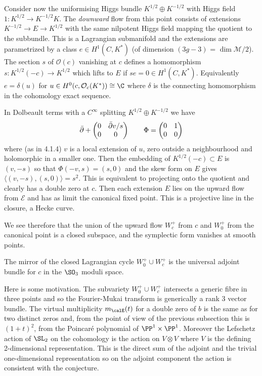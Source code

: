 Consider now the uniformising Higgs bundle $K^{1/2}\oplus K^{-1/2}$ with Higgs field $1: K^{1/2}\rightarrow K^{-1/2}K$. The {\it downward}
flow from this point consists of extensions $K^{-1/2}\rightarrow E\rightarrow K^{1/2}$ with the same nilpotent Higgs field mapping the quotient to the subbundle. This is a Lagrangian submanifold and the
extensions are parametrized by a class $e\in H^1(C,K^*)$ (of  dimension $(3g-3)$ = $\dim {\mathcal M}/2$). The section $s$
of ${\mathcal O}(c)$
vanishing at $c$ defines a homomorphism $s:K^{1/2}(-c)\rightarrow K^{1/2}$ which lifts to $E$ if $se=0\in  H^1(C,K^*)$. Equivalently
$e=\delta(u)$ for
$u\in H^0(c,{\mathcal O}_c(K^*))\cong \C$ where $\delta$ is the connecting homomorphism in the cohomology exact sequence.

In Dolbeault terms with a $C^{\infty}$ splitting $K^{1/2}\oplus K^{-1/2}$ we have
$$\bar\partial+ \begin{pmatrix}0 & \bar\partial v/s\cr
0 & 0\end{pmatrix}\qquad \Phi= \begin{pmatrix}0 & 1\cr
0 & 0\end{pmatrix} $$
where (as in 4.1.4) $v$ is a local extension of $u$, zero outside a neighbourhood and holomorphic in a smaller one.  Then the embedding of $K^{1/2}(-c)\subset E$ is $(v,-s)$ so that $\Phi(-v,s)=(s,0)$ and
the skew form
on $E$ gives
$\langle (v,-s),(s,0)\rangle= s^2$. This is equivalent to projecting onto the quotient and clearly has a double zero at $c$. Then each extension $E$
lies on the upward flow from ${\mathcal E}$ and has as limit the canonical fixed point. This is a projective line in the closure, a Hecke curve.


We see therefore that the union of the upward flow $W^+_c$ from $c$ and $W^+_0$ from the canonical point is a closed subspace, and the symplectic form vanishes at  smooth points.

\begin{conjecture}
\notready  The mirror
	of the closed Lagrangian cycle $W^+_0\cup W^+_c$ is the universal adjoint bundle for $c$ in the $\SO_3$ moduli space. \end{conjecture}

Here is some motivation.  The subvariety $W^+_0\cup W^+_c$ intersects a generic fibre in three points and so the Fourier-Mukai transform is generically a rank $3$
vector bundle. The virtual multiplicity $m_\calE(t)$ for a double zero of $b$ is the same as for two distinct zeros and, from the point of view of the previous subsection this is  $(1+t)^2$, from the Poincar\'e polynomial of $\PP^1\times \PP^1$. Moreover the Lefschetz action of $\SL_2$ on the cohomology is the action on $V\otimes V$ where $V$ is the defining 2-dimensional representation. This is the direct sum of the adjoint  and the trivial one-dimensional
representation so on the adjoint component the action is consistent with the conjecture.

